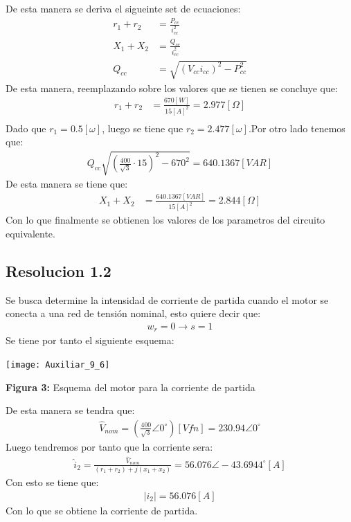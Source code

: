 \documentclass[
  11pt,
  letterpaper,
   addpoints,
   answers
  ]{exam}
\begin{document}
\begin{questions}
\begin{solution}
\begin{center}
        \end{center}
        De esta manera se deriva el sigueinte set de ecuaciones:
        \begin{align}
            r_{1} + r_{2} &= \frac{P_{cc}}{i^{2}_{cc}}\\
            X_{1} + X_{2} &= \frac{Q_{cc}}{i^{2}_{cc}}\\
            Q_{cc} &= \sqrt{(V_{cc}i_{cc})^{2} - P_{cc}^{2}}
        \end{align}
        De esta manera, reemplazando sobre los valores que se tienen se concluye que:
        \begin{align}
            r_{1} + r_{2} &= \frac{670[W]}{15[A]^{2}} = 2.977[\Omega]\\
        \end{align}
        Dado que $r_{1} = 0.5[\omega]$, luego se tiene que $r_{2} = 2.477[\omega]$.Por otro lado tenemos que:
        \begin{align}
            Q_{cc} \sqrt{ \left(\frac{400}{\sqrt{3}} \cdot 15 \right)^{2} - 670^{2}} = 640.1367[VAR]
        \end{align}
        De esta manera se tiene que:
        \begin{align}
            X_{1} + X_{2} &= \frac{640.1367[VAR]}{15[A]^{2}} = 2.844[\Omega]
        \end{align}
        Con lo que finalmente se obtienen los valores de los parametros del circuito equivalente.
        \subsection*{Resolucion 1.2}
        Se busca determine la intensidad de corriente de partida cuando el motor se conecta a una red de tensión nominal, esto quiere decir que:
        \begin{align}
            w_{r} = 0 \rightarrow s = 1 
        \end{align}
        Se tiene por tanto el siguiente esquema:
        \begin{center}
            \texttt{[image: Auxiliar\_9\_6]}
        \end{center}
        \begin{center}
            \textbf{Figura 3:} Esquema del motor para la corriente de partida
        \end{center}
        De esta manera se tendra que:
        \begin{align}
            \hat{V}_{nom} = \left(\frac{400}{\sqrt{3}}\angle 0^{\circ}\right)[Vfn]= 230.94 \angle 0^{\circ}
        \end{align}
        Luego tendremos por tanto que la corriente sera:
        \begin{align}
            \hat{i}_{2} = \frac{\hat{V}_{nom}}{(r_{1} + r_{2}) + j(x_{1} + x_{2})} = 56.076 \angle -43.6944^{\circ}[A]
        \end{align}
        Con esto se tiene que:
        \begin{align}
            |i_{2}| = 56.076[A]
        \end{align}
        Con lo que se obtiene la corriente de partida.

\end{solution}
\end{questions}
\end{document}
